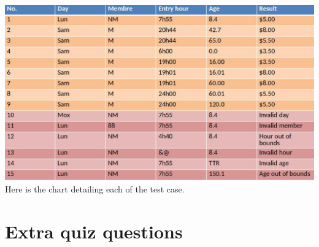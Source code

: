 \documentclass[12pt]{book}
\begin{document}
\includegraphics*[scale=0.35]{images/testtable.jpg}
Here is the chart detailing each of the test case.

\chapter{Extra quiz questions}
\end{document}
